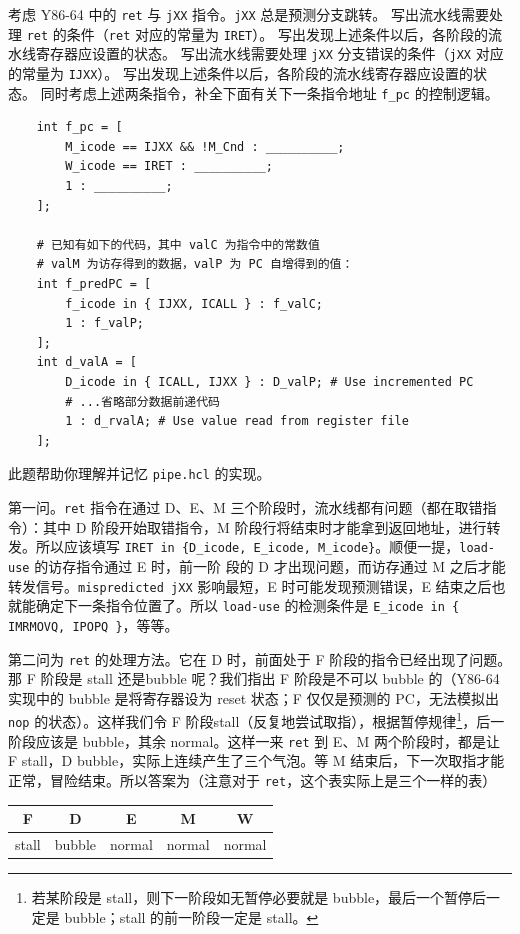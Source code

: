 \begin{problems}
        \pro 考虑 Y86-64 中的 \verb|ret| 与 \verb|jXX| 指令。\verb|jXX| 总是预测分支跳转。
            \qn 写出流水线需要处理 \verb|ret| 的条件（\verb|ret| 对应的常量为 \verb|IRET|）。
            \qn 写出发现上述条件以后，各阶段的流水线寄存器应设置的状态。
            \qn 写出流水线需要处理 \verb|jXX| 分支错误的条件（\verb|jXX| 对应的常量为 \verb|IJXX|）。
            \qn 写出发现上述条件以后，各阶段的流水线寄存器应设置的状态。
            \qn 同时考虑上述两条指令，补全下面有关下一条指令地址 \verb|f_pc| 的控制逻辑。
            \begin{verbatim}
    int f_pc = [
        M_icode == IJXX && !M_Cnd : __________;
        W_icode == IRET : __________;
        1 : __________;
    ];

    # 已知有如下的代码，其中 valC 为指令中的常数值
    # valM 为访存得到的数据，valP 为 PC 自增得到的值：
    int f_predPC = [
        f_icode in { IJXX, ICALL } : f_valC;
        1 : f_valP;
    ];
    int d_valA = [
        D_icode in { ICALL, IJXX } : D_valP; # Use incremented PC
        # ...省略部分数据前递代码
        1 : d_rvalA; # Use value read from register file
    ]; 
            \end{verbatim}
        \sol 此题帮助你理解并记忆 \verb|pipe.hcl| 的实现。
        
        第一问。\verb|ret| 指令在通过 D、E、M 三个阶段时，流水线都有问题（都在取错指令）：其中 D 阶段开始取错指令，M 阶段行将结束时才能拿到返回地址，进行转发。所以应该填写 \verb|IRET in {D_icode, E_icode, M_icode}|。顺便一提，\verb|load-use| 的访存指令通过 E 时，前一阶
        段的 D 才出现问题，而访存通过 M 之后才能转发信号。\verb|mispredicted jXX| 影响最短，E 时可能发现预测错误，E 结束之后也就能确定下一条指令位置了。所以 \verb|load-use| 的检测条件是 \verb|E_icode in { IMRMOVQ, IPOPQ }|，等等。

        第二问为 \verb|ret| 的处理方法。它在 D 时，前面处于 F 阶段的指令已经出现了问题。那 F 阶段是 stall 还是bubble 呢？我们指出 F 阶段是不可以 bubble 的（Y86-64 实现中的 bubble 是将寄存器设为 reset 状态；F 仅仅是预测的 PC，无法模拟出 \verb|nop| 的状态）。这样我们令 F 阶段stall（反复地尝试取指），根据暂停规律\footnote{若某阶段是 stall，则下一阶段如无暂停必要就是 bubble，最后一个暂停后一定是 bubble；stall 的前一阶段一定是 stall。}，后一阶段应该是 bubble，其余 normal。这样一来 \verb|ret| 到 E、M 两个阶段时，都是让 F stall，D bubble，实际上连续产生了三个气泡。等 M 结束后，下一次取指才能正常，冒险结束。所以答案为（注意对于 \verb|ret|，这个表实际上是三个一样的表）
        \begin{table}[H]
            \centering
            \begin{tabular}{|c|c|c|c|c|}
                \hline
                F & D & E & M & W \\ \hline
                stall & bubble & normal & normal & normal \\ \hline
            \end{tabular}
        \end{table}


\end{problems}
